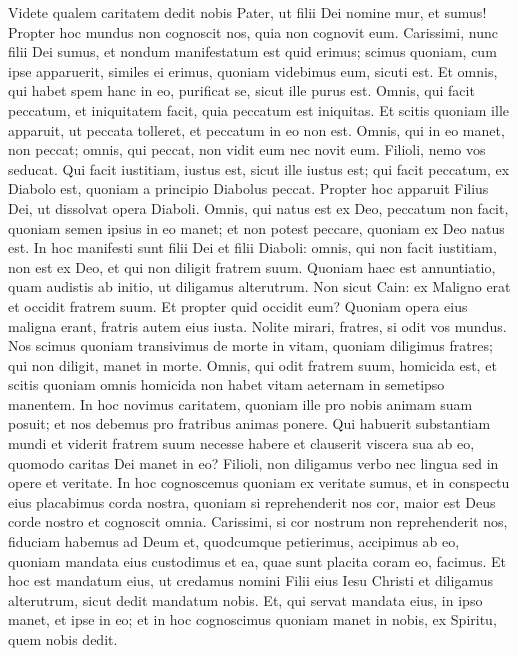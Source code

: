 \begin{biblechapter} 
\verse Videte qualem caritatem dedit nobis Pater, ut filii Dei nomine mur, et sumus! Propter hoc mundus non cognoscit nos, quia non cognovit eum. 
\verse Carissimi, nunc filii Dei sumus, et nondum manifestatum est quid erimus; scimus quoniam, cum ipse apparuerit, similes ei erimus, quoniam videbimus eum, sicuti est. 
\verse Et omnis, qui habet spem hanc in eo, purificat se, sicut ille purus est. 
\verse Omnis, qui facit peccatum, et iniquitatem facit, quia peccatum est iniquitas.  
\verse Et scitis quoniam ille apparuit, ut peccata tolleret, et peccatum in eo non est. 
\verse Omnis, qui in eo manet, non peccat; omnis, qui peccat, non vidit eum nec novit eum. 
\verse Filioli, nemo vos seducat. Qui facit iustitiam, iustus est, sicut ille iustus est; 
\verse qui facit peccatum, ex Diabolo est, quoniam a principio Diabolus peccat. Propter hoc apparuit Filius Dei, ut dissolvat opera Diaboli. 
\verse Omnis, qui natus est ex Deo, peccatum non facit, quoniam semen ipsius in eo manet; et non potest peccare, quoniam ex Deo natus est. 
\verse In hoc manifesti sunt filii Dei et filii Diaboli: omnis, qui non facit iustitiam, non est ex Deo, et qui non diligit fratrem suum. 
\verse Quoniam haec est annuntiatio, quam audistis ab initio, ut diligamus alterutrum. 
\verse Non sicut Cain: ex Maligno erat et occidit fratrem suum. Et propter quid occidit eum? Quoniam opera eius maligna erant, fratris autem eius iusta. 
\verse Nolite mirari, fratres, si odit vos mundus. 
\verse Nos scimus quoniam transivimus de morte in vitam, quoniam diligimus fratres; qui non diligit, manet in morte. 
\verse Omnis, qui odit fratrem suum, homicida est, et scitis quoniam omnis homicida non habet vitam aeternam in semetipso manentem. 
\verse In hoc novimus caritatem, quoniam ille pro nobis animam suam posuit; et nos debemus pro fratribus animas ponere. 
\verse Qui habuerit substantiam mundi et viderit fratrem suum necesse habere et clauserit viscera sua ab eo, quomodo caritas Dei manet in eo? 
\verse Filioli, non diligamus verbo nec lingua sed in opere et veritate. 
\verse In hoc cognoscemus quoniam ex veritate sumus, et in conspectu eius placabimus corda nostra, 
\verse quoniam si reprehenderit nos cor, maior est Deus corde nostro et cognoscit omnia. 
\verse Carissimi, si cor nostrum non reprehenderit nos, fiduciam habemus ad Deum 
\verse et, quodcumque petierimus, accipimus ab eo, quoniam mandata eius custodimus et ea, quae sunt placita coram eo, facimus. 
\verse Et hoc est mandatum eius, ut credamus nomini Filii eius Iesu Christi et diligamus alterutrum, sicut dedit mandatum nobis. 
\verse Et, qui servat mandata eius, in ipso manet, et ipse in eo; et in hoc cognoscimus quoniam manet in nobis, ex Spiritu, quem nobis dedit. 
\end{biblechapter}

